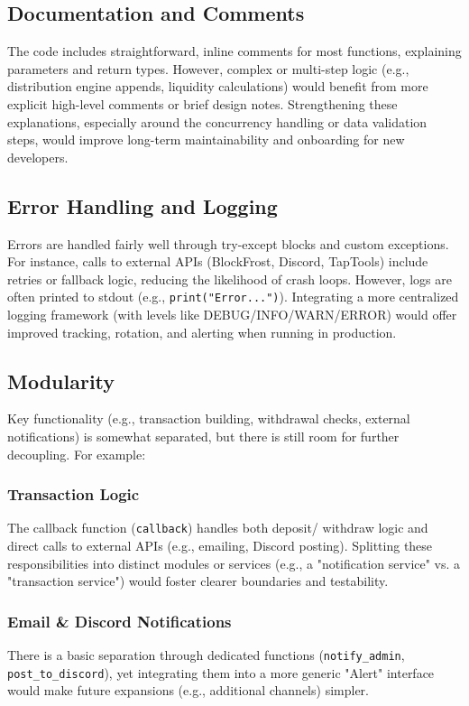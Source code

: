 \documentclass[11pt,a4paper]{article}
\begin{document}
\subsection{Documentation and Comments}
The code includes straightforward, inline comments for most functions, explaining parameters and return types. However, complex or multi-step logic (e.g., distribution engine appends, liquidity calculations) would benefit from more explicit high-level comments or brief design notes. Strengthening these explanations, especially around the concurrency handling or data validation steps, would improve long-term maintainability and onboarding for new developers.

\subsection{Error Handling and Logging}
Errors are handled fairly well through try-except blocks and custom exceptions. For instance, calls to external APIs (BlockFrost, Discord, TapTools) include retries or fallback logic, reducing the likelihood of crash loops. However, logs are often printed to stdout (e.g., \texttt{print("Error...")}). Integrating a more centralized logging framework (with levels like DEBUG/INFO/WARN/ERROR) would offer improved tracking, rotation, and alerting when running in production.

\subsection{Modularity}
Key functionality (e.g., transaction building, withdrawal checks, external notifications) is somewhat separated, but there is still room for further decoupling. For example:

\subsubsection{Transaction Logic}
The callback function (\texttt{callback}) handles both deposit/ withdraw logic and direct calls to external APIs (e.g., emailing, Discord posting). Splitting these responsibilities into distinct modules or services (e.g., a "notification service" vs. a "transaction service") would foster clearer boundaries and testability.

\subsubsection{Email \& Discord Notifications}
There is a basic separation through dedicated functions (\texttt{notify\_admin}, \texttt{post\_to\_discord}), yet integrating them into a more generic "Alert" interface would make future expansions (e.g., additional channels) simpler.
\end{document}
